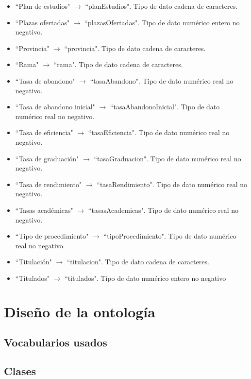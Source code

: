 \begin{itemize}
	\item ``Plan de estudios" $\rightarrow$ ``planEstudios". Tipo de dato cadena de caracteres.
	\item ``Plazas ofertadas" $\rightarrow$ ``plazasOfertadas". Tipo de dato numérico entero no negativo.
	\item ``Provincia" $\rightarrow$ ``provincia". Tipo de dato cadena de caracteres.
	\item ``Rama" $\rightarrow$ ``rama". Tipo de dato cadena de caracteres.
	\item ``Tasa de abandono" $\rightarrow$ ``tasaAbandono". Tipo de dato numérico real no negativo.
	\item ``Tasa de abandono inicial" $\rightarrow$ ``tasaAbandonoInicial". Tipo de dato numérico real no negativo.
	\item ``Tasa de eficiencia" $\rightarrow$ ``tasaEficiencia". Tipo de dato numérico real no negativo.
	\item ``Tasa de graduación" $\rightarrow$ ``tasaGraduacion". Tipo de dato numérico real no negativo.
	\item ``Tasa de rendimiento" $\rightarrow$ ``tasaRendimiento". Tipo de dato numérico real no negativo.
	\item ``Tasas académicas" $\rightarrow$ ``tasasAcademicas". Tipo de dato numérico real no negativo.
	\item ``Tipo de procedimiento" $\rightarrow$ ``tipoProcedimiento". Tipo de dato numérico real no negativo.
	\item ``Titulación" $\rightarrow$ ``titulacion". Tipo de dato cadena de caracteres.
	\item ``Titulados" $\rightarrow$ ``titulados". Tipo de dato numérico entero no negativo
\end{itemize}


\section{Diseño de la ontología}

\subsection{Vocabularios usados}

\subsection{Clases}


